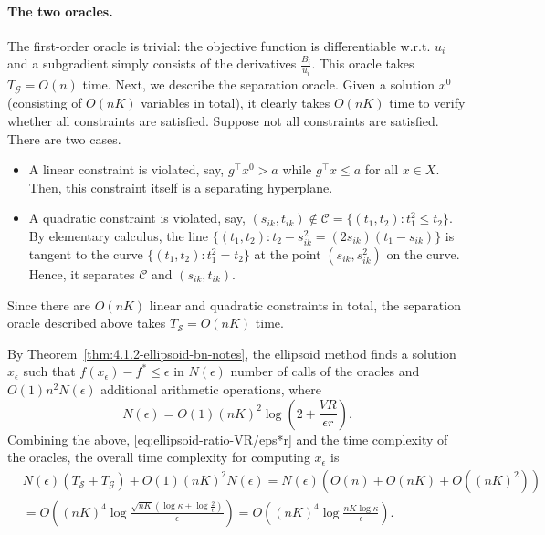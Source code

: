 \paragraph{The two oracles.}
The first-order oracle is trivial: the objective function is differentiable w.r.t. $u_i$ and a subgradient simply consists of the derivatives $\frac{B_i}{u_i}$. This oracle takes $T_\mathcal{G} = O(n)$ time. 
Next, we describe the separation oracle. Given a solution $x^0$ (consisting of $O(nK)$ variables in total), it clearly takes $O(nK)$ time to verify whether all constraints are satisfied. Suppose not all constraints are satisfied. There are two cases.
\begin{itemize}
	\item A linear constraint is violated, say, $g^\top x^0 > a$ while $g^\top x \leq a$ for all $x\in X$. Then, this constraint itself is a separating hyperplane.
	\item A quadratic constraint is violated, say, $(s_{ik}, t_{ik}) \notin \mathcal{C} = \{(t_1, t_2): t_1^2 \leq t_2\}$. By elementary calculus, the line
	$\{ (t_1, t_2): t_2 - s_{ik}^2 = (2s_{ik}) (t_1 - s_{ik}) \}$ is tangent to the curve $\{(t_1, t_2): t_1^2 = t_2\}$ at the point $(s_{ik}, s_{ik}^2)$ on the curve. Hence, it separates $\mathcal{C}$ and $(s_{ik}, t_{ik})$.
\end{itemize}
Since there are $O(nK)$ linear and quadratic constraints in total, the separation oracle described above takes $T_\mathcal{S} = O(nK)$ time. 

By Theorem~\ref{thm:4.1.2-ellipsoid-bn-notes}, the ellipsoid method finds a solution $x_\epsilon$ such that $f(x_\epsilon) - f^* \leq \epsilon$ in $N(\epsilon)$ number of calls of the oracles and $O(1)n^2N(\epsilon)$ additional arithmetic operations, where 
\[ N(\epsilon) = O(1) (nK)^2 \log \left( 2 + \frac{VR}{\epsilon r} \right). \]
Combining the above, \eqref{eq:ellipsoid-ratio-VR/eps*r} and the time complexity of the oracles, the overall time complexity for computing $x_\epsilon$ is
\begin{align}
	& N(\epsilon)(T_\mathcal{S} + T_\mathcal{G}) + O(1)(nK)^2 N(\epsilon) = N(\epsilon)\left(O(n) + O(nK) + O((nK)^2) \right) \nonumber \\
	& = O\left( (nK)^4 \log \frac{ \sqrt{nK}\left(\log \kappa + \log \frac{2}{\epsilon}\right) }{\epsilon} \right)  = O\left( (nK)^4 \log \frac{ nK \log \kappa }{\epsilon} \right). 
	\label{eq:ellipsoid-comp-for-eps-solution-proof}
\end{align} 

